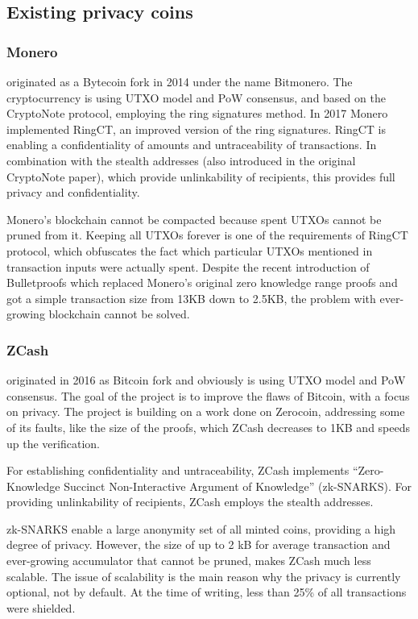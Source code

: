 \documentclass[a4paper, 10pt, conference]{ieeeconf}
\begin{document}
\subsection{Existing privacy coins}

\subsubsection{Monero}

originated as a Bytecoin fork in 2014 under the name Bitmonero. The cryptocurrency is using UTXO model and PoW consensus, and based on the CryptoNote protocol\cite{c2}, employing the ring signatures method. In 2017 Monero implemented RingCT\cite{c3}, an improved version of the ring signatures. RingCT is enabling a confidentiality of amounts and untraceability of transactions. In combination with the stealth addresses (also introduced in the original CryptoNote paper), which provide unlinkability of recipients, this provides full privacy and confidentiality.

Monero's blockchain cannot be compacted because spent UTXOs cannot be pruned from it. Keeping all UTXOs forever is one of the requirements of RingCT protocol, which obfuscates the fact which particular UTXOs mentioned in transaction inputs were actually spent. 
Despite the recent introduction of Bulletproofs\cite{c4} which replaced Monero's original zero knowledge range proofs and got a simple transaction size from 13KB down to 2.5KB, the problem with ever-growing blockchain cannot be solved. 

\subsubsection{ZCash}

originated in 2016 as Bitcoin fork and obviously is using UTXO model and PoW consensus. The goal of the project is to improve the flaws of Bitcoin, with a focus on privacy. The project is building on a work done on Zerocoin\cite{c5}, addressing some of its faults, like the size of the proofs, which ZCash decreases to 1KB and speeds up the verification.

For establishing confidentiality and untraceability, ZCash implements ``Zero-Knowledge Succinct Non-Interactive Argument of Knowledge'' (zk-SNARKS)\cite{c6}. For providing unlinkability of recipients, ZCash employs the stealth addresses.

zk-SNARKS enable a large anonymity set of all minted coins, providing a high degree of privacy. However, the size of up to 2 kB for average transaction and ever-growing accumulator that cannot be pruned, makes ZCash much less scalable. The issue of
scalability is the main reason why the privacy is currently optional, not by default. At the time of writing, less than 25\% of all transactions were shielded.
\end{document}
